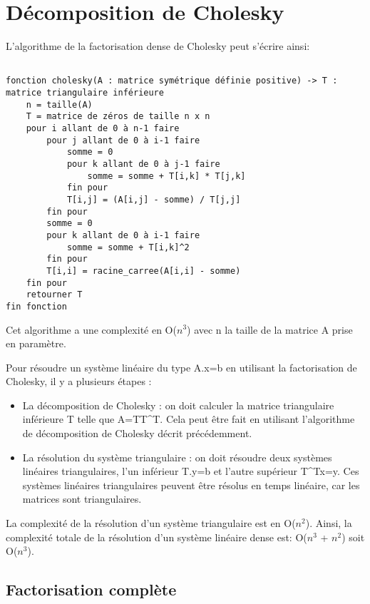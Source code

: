 

\section{Décomposition de Cholesky}
\label{sec:decomp_cholesky}

L'algorithme de la factorisation dense de Cholesky peut s'écrire ainsi:
\begin{verbatim}

fonction cholesky(A : matrice symétrique définie positive) -> T : matrice triangulaire inférieure
    n = taille(A)
    T = matrice de zéros de taille n x n
    pour i allant de 0 à n-1 faire
        pour j allant de 0 à i-1 faire
            somme = 0
            pour k allant de 0 à j-1 faire
                somme = somme + T[i,k] * T[j,k]
            fin pour
            T[i,j] = (A[i,j] - somme) / T[j,j]
        fin pour
        somme = 0
        pour k allant de 0 à i-1 faire
            somme = somme + T[i,k]^2
        fin pour
        T[i,i] = racine_carree(A[i,i] - somme)
    fin pour
    retourner T
fin fonction

\end{verbatim}

Cet algorithme a une complexité en O($n^3$) avec n la taille de la matrice A prise en paramètre.

Pour résoudre un système linéaire du type A.x=b en utilisant la factorisation de Cholesky, il y a plusieurs étapes : 
\begin{itemize}
    \item La décomposition de Cholesky : on doit calculer la matrice triangulaire inférieure T telle que A=TT^T. Cela peut être fait en utilisant l'algorithme de décomposition de Cholesky décrit précédemment.
    \item La résolution du système triangulaire : on doit résoudre deux systèmes linéaires triangulaires, l'un inférieur T.y=b et l'autre supérieur T^Tx=y. Ces systèmes linéaires triangulaires peuvent être résolus en temps linéaire, car les matrices sont triangulaires. 
\end{itemize}
La complexité de la résolution d'un système triangulaire est en O($n^2$). Ainsi, la complexité totale de la résolution d'un système linéaire dense est: O($n^3$ + $n^2$) soit O($n^3$). 

\subsection{Factorisation complète}
\label{ssec:factor_compl}

